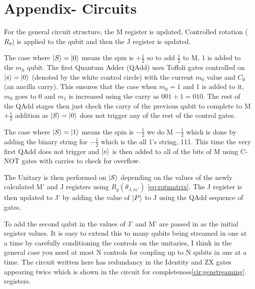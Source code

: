 \appendix
\section{Appendix- Circuits}

For the general circuit structure, the M register is updated, Controlled rotation ($R_\theta$) is applied to the qubit and then the J register is updated.

The case where $\left\vert{S}\right\rangle = \left\vert{0}\right\rangle$ means the spin is $+\frac{1}{2}$ so to add $\frac{1}{2}$ to M, 1 is added to the $m_0$ qubit. The first Quantum Adder (QAdd) uses Toffoli gates controlled on $\left\vert{s}\right\rangle=\left\vert{0}\right\rangle$ (denoted by the white control circle) with the current $m_0$ value and $C_0$ (an ancilla carry). This ensures that the case when $m_0 = 1$ and 1 is added to it, $m_0$ goes to 0 and $m_1$ is increased using the carry as $001+1=010$. The rest of the QAdd stages then just check the carry of the previous qubit to complete to M $+ \frac{1}{2}$ addition as $\left\vert{S}\right\rangle = \left\vert{0}\right\rangle$ does not trigger any of the rest of the control gates.

The case where $\left\vert{S}\right\rangle = \left\vert{1}\right\rangle$ means the spin is $-\frac{1}{2}$ we do M $-\frac{1}{2}$ which is done by adding the binary string for $-\frac{1}{2}$ which is the all 1's string, 111. This time the very first QAdd does not trigger and $\left\vert{s}\right\rangle$ is then added to all of the bits of M using C-NOT gates with carries to check for overflow. 

The Unitary is then performed on $\left\vert{S}\right\rangle$ depending on the values of the newly calculated M' and J registers using $R_y(\theta_{J,m'})$ \autoref{eq:rotmatrix}. The J register is then updated to J' by adding the value of $\left\vert{P}\right\rangle$ to J using the QAdd sequence of gates.

To add the second qubit in the values of J' and M' are passed in as the initial register values. It is easy to extend this to many qubits being streamed in one at a time by carefully conditioning the controls on the unitaries, I think in the general case you need at most N controls for coupling up to N qubits in one at a time. The circuit written here has redundancy in the Identity and ZX gates appearing twice which is shown in the circuit for completeness\autoref{cir:genstreaming}. 
registers.


